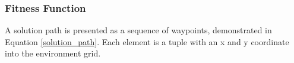 \documentclass{tamuccthesis}
\begin{document}

\subsubsection{Fitness Function}
\label{section:fitness_function}

A solution path is presented as a sequence of waypoints, demonstrated in Equation \ref{solution_path}. Each element is a tuple with an x and y coordinate into the environment grid. 
\end{document}
